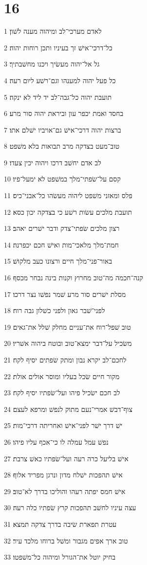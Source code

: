 \chapter{16}

\par 1 לאדם מערכי־לב ומיהוה מענה לשׁון׃
\par 2 כל־דרכי־אישׁ זך בעיניו ותכן רוחות יהוה׃
\par 3 גל אל־יהוה מעשׂיך ויכנו מחשׁבתיך׃
\par 4 כל פעל יהוה למענהו וגם־רשׁע ליום רעה׃
\par 5 תועבת יהוה כל־גבה־לב יד ליד לא ינקה׃
\par 6 בחסד ואמת יכפר עון וביראת יהוה סור מרע׃
\par 7 ברצות יהוה דרכי־אישׁ גם־אויביו ישׁלם אתו׃
\par 8 טוב־מעט בצדקה מרב תבואות בלא משׁפט׃
\par 9 לב אדם יחשׁב דרכו ויהוה יכין צעדו׃
\par 10 קסם על־שׂפתי־מלך במשׁפט לא ימעל־פיו׃
\par 11 פלס ומאזני משׁפט ליהוה מעשׂהו כל־אבני־כיס׃
\par 12 תועבת מלכים עשׂות רשׁע כי בצדקה יכון כסא׃
\par 13 רצון מלכים שׂפתי־צדק ודבר ישׁרים יאהב׃
\par 14 חמת־מלך מלאכי־מות ואישׁ חכם יכפרנה׃
\par 15 באור־פני־מלך חיים ורצונו כעב מלקושׁ׃
\par 16 קנה־חכמה מה־טוב מחרוץ וקנות בינה נבחר מכסף׃
\par 17 מסלת ישׁרים סור מרע שׁמר נפשׁו נצר דרכו׃
\par 18 לפני־שׁבר גאון ולפני כשׁלון גבה רוח׃
\par 19 טוב שׁפל־רוח את־עניים מחלק שׁלל את־גאים׃
\par 20 משׂכיל על־דבר ימצא־טוב ובוטח ביהוה אשׁריו׃
\par 21 לחכם־לב יקרא נבון ומתק שׂפתים יסיף לקח׃
\par 22 מקור חיים שׂכל בעליו ומוסר אולים אולת׃
\par 23 לב חכם ישׂכיל פיהו ועל־שׂפתיו יסיף לקח׃
\par 24 צוף־דבשׁ אמרי־נעם מתוק לנפשׁ ומרפא לעצם׃
\par 25 ישׁ דרך ישׁר לפני־אישׁ ואחריתה דרכי־מות׃
\par 26 נפשׁ עמל עמלה לו כי־אכף עליו פיהו׃
\par 27 אישׁ בליעל כרה רעה ועל־שׂפתיו כאשׁ צרבת׃
\par 28 אישׁ תהפכות ישׁלח מדון ונרגן מפריד אלוף׃
\par 29 אישׁ חמס יפתה רעהו והוליכו בדרך לא־טוב׃
\par 30 עצה עיניו לחשׁב תהפכות קרץ שׂפתיו כלה רעה׃
\par 31 עטרת תפארת שׂיבה בדרך צדקה תמצא׃
\par 32 טוב ארך אפים מגבור ומשׁל ברוחו מלכד עיר׃
\par 33 בחיק יוטל את־הגורל ומיהוה כל־משׁפטו׃

